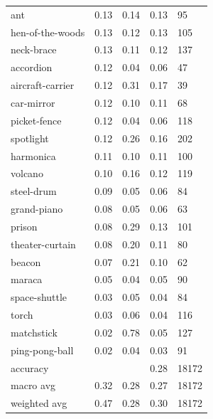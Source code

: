 \begin{center}
\begin{longtable}{lllll}
ant & 0.13 & 0.14 & 0.13 & 95 \\
hen-of-the-woods & 0.13 & 0.12 & 0.13 & 105 \\
neck-brace & 0.13 & 0.11 & 0.12 & 137 \\
accordion & 0.12 & 0.04 & 0.06 & 47 \\
aircraft-carrier & 0.12 & 0.31 & 0.17 & 39 \\
car-mirror & 0.12 & 0.10 & 0.11 & 68 \\
picket-fence & 0.12 & 0.04 & 0.06 & 118 \\
spotlight & 0.12 & 0.26 & 0.16 & 202 \\
harmonica & 0.11 & 0.10 & 0.11 & 100 \\
volcano & 0.10 & 0.16 & 0.12 & 119 \\
steel-drum & 0.09 & 0.05 & 0.06 & 84 \\
grand-piano & 0.08 & 0.05 & 0.06 & 63 \\
prison & 0.08 & 0.29 & 0.13 & 101 \\
theater-curtain & 0.08 & 0.20 & 0.11 & 80 \\
beacon & 0.07 & 0.21 & 0.10 & 62 \\
maraca & 0.05 & 0.04 & 0.05 & 90 \\
space-shuttle & 0.03 & 0.05 & 0.04 & 84 \\
torch & 0.03 & 0.06 & 0.04 & 116 \\
matchstick & 0.02 & 0.78 & 0.05 & 127 \\
ping-pong-ball & 0.02 & 0.04 & 0.03 & 91 \\
\midrule
accuracy &  &  & 0.28 & 18172 \\
macro avg & 0.32 & 0.28 & 0.27 & 18172 \\
weighted avg & 0.47 & 0.28 & 0.30 & 18172 \\
\bottomrule
\end{longtable}
\end{center}
